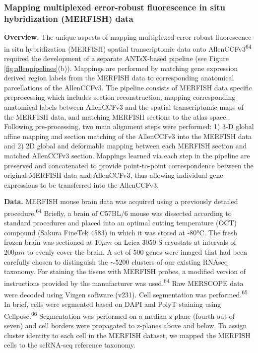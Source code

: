 \documentclass[
  12pt,
]{article}
\begin{document}
\hypertarget{mapping-multiplexed-error-robust-fluorescence-in-situ-hybridization-merfish-data}{%
\subsubsection{Mapping multiplexed error-robust fluorescence in situ
hybridization (MERFISH)
data}\label{mapping-multiplexed-error-robust-fluorescence-in-situ-hybridization-merfish-data}}

\textbf{Overview.} The unique aspects of mapping multiplexed
error-robust fluorescence in situ hybridization (MERFISH) spatial
transcriptomic data onto AllenCCFv3\textsuperscript{64} required the
development of a separate ANTsX-based pipeline (see Figure
\ref{fig:allenpipelines}(b)). Mappings are performed by matching gene
expression derived region labels from the MERFISH data to corresponding
anatomical parcellations of the AllenCCFv3. The pipeline consists of
MERFISH data specific preprocessing which includes section
reconstruction, mapping corresponding anatomical labels between
AllenCCFv3 and the spatial transcriptomic maps of the MERFISH data, and
matching MERFISH sections to the atlas space. Following pre-processing,
two main alignment steps were performed: 1) 3-D global affine mapping
and section matching of the AllenCCFv3 into the MERFISH data and 2) 2D
global and deformable mapping between each MERFISH section and matched
AllenCCFv3 section. Mappings learned via each step in the pipeline are
preserved and concatenated to provide point-to-point correspondence
between the original MERFISH data and AllenCCFv3, thus allowing
individual gene expressions to be transferred into the AllenCCFv3.

\textbf{Data.} MERFISH mouse brain data was acquired using a previously
detailed procedure.\textsuperscript{64} Briefly, a brain of C57BL/6
mouse was dissected according to standard procedures and placed into an
optimal cutting temperature (OCT) compound (Sakura FineTek 4583) in
which it was stored at -80°C. The fresh frozen brain was sectioned at
\(10 \mu m\) on Leica 3050 S cryostats at intervals of \(200 \mu m\) to
evenly cover the brain. A set of 500 genes were imaged that had been
carefully chosen to distinguish the \(\sim5200\) clusters of our
existing RNAseq taxonomy. For staining the tissue with MERFISH probes, a
modified version of instructions provided by the manufacturer was
used.\textsuperscript{64} Raw MERSCOPE data were decoded using Vizgen
software (v231). Cell segmentation was performed.\textsuperscript{65} In
brief, cells were segmented based on DAPI and PolyT staining using
Cellpose.\textsuperscript{66} Segmentation was performed on a median
z-plane (fourth out of seven) and cell borders were propagated to
z-planes above and below. To assign cluster identity to each cell in the
MERFISH dataset, we mapped the MERFISH cells to the scRNA-seq reference
taxonomy.
\end{document}
